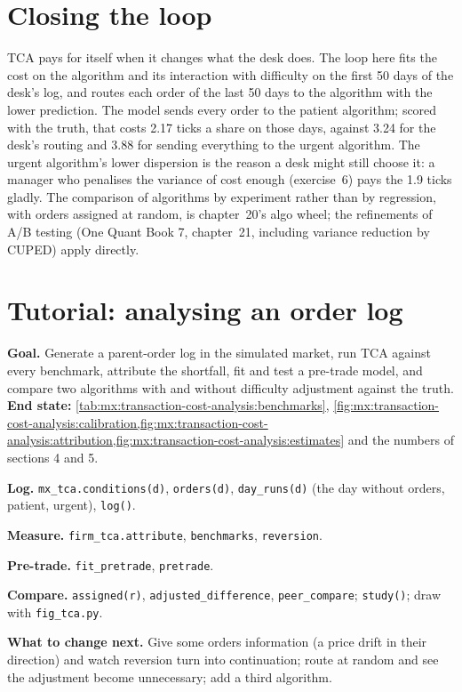 \section{Closing the loop}

TCA pays for itself when it changes what the desk does. The loop here fits the cost on the algorithm and its interaction with difficulty on the first
50 days of the desk's log, and routes each order of the last 50 days to the algorithm with the lower prediction. The model sends every order to the
patient algorithm; scored with the truth, that costs 2.17 ticks a share on those days, against 3.24 for the desk's routing and 3.88 for sending
everything to the urgent algorithm. The urgent algorithm's lower dispersion is the reason a desk might still choose it: a manager who penalises the
variance of cost enough (exercise~6) pays the 1.9 ticks gladly. The comparison of algorithms by experiment rather than by regression, with orders
assigned at random, is chapter~20's algo wheel; the refinements of A/B testing (One Quant Book 7, chapter~21, including variance reduction by CUPED)
apply directly.

\section{Tutorial: analysing an order log}\label{tut:mx:transaction-cost-analysis:tut}

\begin{tutorial}
\textbf{Goal.} Generate a parent-order log in the simulated market, run TCA against every benchmark, attribute the shortfall, fit and test a pre-trade
model, and compare two algorithms with and without difficulty adjustment against the truth.
\textbf{End state:} \cref{tab:mx:transaction-cost-analysis:benchmarks}, \cref{fig:mx:transaction-cost-analysis:calibration,fig:mx:transaction-cost-analysis:attribution,fig:mx:transaction-cost-analysis:estimates}
and the numbers of sections 4 and 5.
\begin{tutsteps}
\item \textbf{Log.} \texttt{mx\_tca.conditions(d)}, \texttt{orders(d)}, \texttt{day\_runs(d)} (the day without orders, patient, urgent),
\texttt{log()}.
\item \textbf{Measure.} \texttt{firm\_tca.attribute}, \texttt{benchmarks}, \texttt{reversion}.
\item \textbf{Pre-trade.} \texttt{fit\_pretrade}, \texttt{pretrade}.
\item \textbf{Compare.} \texttt{assigned(r)}, \texttt{adjusted\_difference}, \texttt{peer\_compare}; \texttt{study()}; draw with \texttt{fig\_tca.py}.
\end{tutsteps}
\textbf{What to change next.} Give some orders information (a price drift in their direction) and watch reversion turn into continuation; route at
random and see the adjustment become unnecessary; add a third algorithm.
\end{tutorial}

